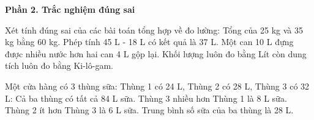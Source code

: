 \textbf{Phần 2. Trắc nghiệm đúng sai}

\begin{ex} %
Xét tính đúng sai của các bài toán tổng hợp về đo lường:
\choiceTF
{\True Tổng của 25 kg và 35 kg bằng 60 kg.}
{Phép tính 45 L - 18 L có kết quả là 37 L.}
{\True Một can 10 L đựng được nhiều nước hơn hai can 4 L gộp lại.}
{Khối lượng luôn đo bằng Lít còn dung tích luôn đo bằng Ki-lô-gam.}
\end{ex}

\begin{ex} %
Một cửa hàng có 3 thùng sữa: Thùng 1 có 24 L, Thùng 2 có 28 L, Thùng 3 có 32 L:
\choiceTF
{\True Cả ba thùng có tất cả 84 L sữa.}
{\True Thùng 3 nhiều hơn Thùng 1 là 8 L sữa.}
{Thùng 2 ít hơn Thùng 3 là 6 L sữa.}
{\True Trung bình số sữa của ba thùng là 28 L.}
\end{ex}

